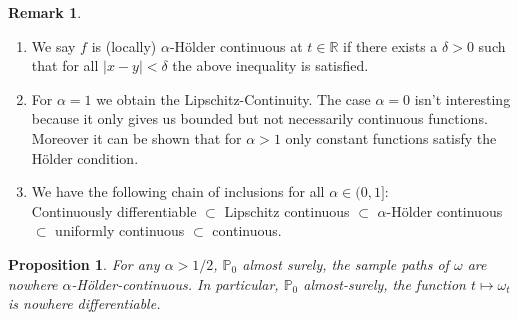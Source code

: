 \documentclass[11pt,a4paper, final]{article}
\newtheorem{prop}{Proposition}[section]
\theoremstyle{definition}
\newtheorem{rem}{Remark}[section]
\begin{document}
\begin{rem} \
\begin{enumerate}
\item We say $f$ is (locally) $\alpha$-Hölder continuous at $t \in \mathbb{R}$ if there exists a $\delta >0$ such that for  all $|x-y| < \delta$ the above inequality is satisfied.
\item For $\alpha = 1$ we obtain the Lipschitz-Continuity. The case $\alpha=0$ isn't interesting because it only gives us bounded but not necessarily continuous functions. Moreover it can be shown that for $\alpha >1$ only constant functions satisfy the Hölder condition.
\item We have the following chain of inclusions for all $\alpha \in (0,1]$: \\ Continuously differentiable $\subset$ Lipschitz continuous $\subset$ $\alpha$-Hölder continuous $\subset$ uniformly continuous $\subset$ continuous. 
\end{enumerate}
\end{rem}
\begin{prop} For any $\alpha > 1/2$, $\mathbb{P}_0$ almost surely, the sample paths of $\omega$ are nowhere $\alpha$-Hölder-continuous. In particular, $\mathbb{P}_0$ almost-surely, the function $t \mapsto \omega_t$ is nowhere differentiable. 
\end{prop}
\end{document}
